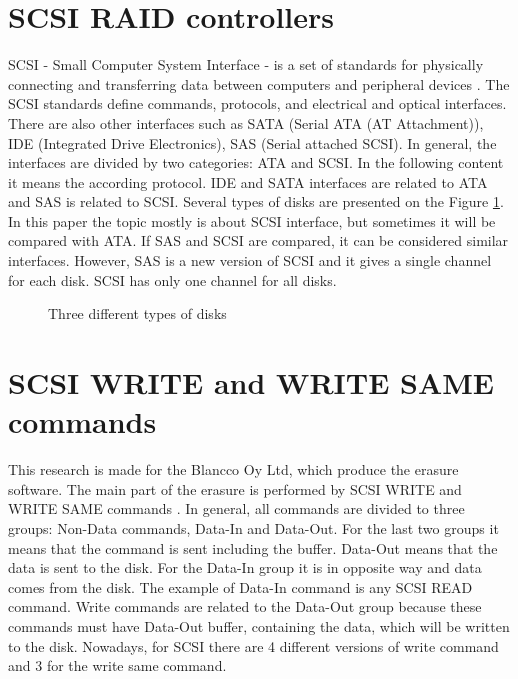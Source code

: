 \section{SCSI RAID controllers}
SCSI - Small Computer System Interface - is a set of standards for physically connecting and transferring data between computers and peripheral devices \cite{book_of_scsi}. The SCSI standards define commands, protocols, and electrical and optical interfaces. There are also other interfaces such as SATA (Serial ATA (AT Attachment)), IDE (Integrated Drive Electronics), SAS (Serial attached SCSI). In general, the interfaces are divided by two categories: ATA and SCSI. In the following content it means the according protocol. IDE and SATA interfaces are related to ATA and SAS is related to SCSI. Several types of disks are presented on the Figure \ref{fig:disks}. In this paper the topic mostly is about SCSI interface, but sometimes it will be compared with ATA. If SAS and SCSI are compared, it can be considered similar interfaces. However, SAS is a new version of SCSI and it gives a single channel for each disk. SCSI has only one channel for all disks.
\begin{figure}[h]
  \advance{}\textwidth
  \caption{Three different types of disks}
  \label{fig:disks}
\end{figure}

\section{SCSI WRITE and WRITE SAME commands}
\label{subsec:write_comm}
This research is made for the Blancco Oy Ltd, which produce the erasure software. The main part of the erasure is performed by SCSI WRITE and WRITE SAME commands \cite{scsi3_bc}. In general, all commands are divided to three groups: Non-Data commands, Data-In and Data-Out. For the last two groups it means that the command is sent including the buffer. Data-Out means that the data is sent to the disk. For the Data-In group it is in opposite way and data comes from the disk. The example of Data-In command is any SCSI READ command. Write commands are related to the Data-Out group because these commands must have Data-Out buffer, containing the data, which will be written to the disk. Nowadays, for SCSI there are 4 different versions of write command and 3 for the write same command.  

